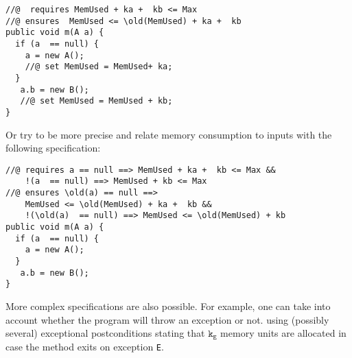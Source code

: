 \begin{lstlisting}[frame=trbl] 
//@  requires MemUsed + ka +  kb <= Max 
//@ ensures  MemUsed <= \old(MemUsed) + ka +  kb     
public void m(A a) {
  if (a  == null) {
    a = new A();
    //@ set MemUsed = MemUsed+ ka;
  }  
   a.b = new B();
   //@ set MemUsed = MemUsed + kb;
}
\end{lstlisting}
Or try to be more precise and relate memory consumption to inputs with
the following specification:
\begin{lstlisting}[frame=trbl] 
//@ requires a == null ==> MemUsed + ka +  kb <= Max &&	 
    !(a  == null) ==> MemUsed + kb <= Max
//@ ensures \old(a) == null ==> 
    MemUsed <= \old(MemUsed) + ka +  kb && 
    !(\old(a)  == null) ==> MemUsed <= \old(MemUsed) + kb    
public void m(A a) {
  if (a  == null) {
    a = new A();
  }  
   a.b = new B();
}
\end{lstlisting}
More complex specifications are also possible. For example, one can
take into account whether the program will throw an exception or not.
using (possibly several) exceptional postconditions stating that
$\texttt{k}_{\texttt{E}}$ memory units are allocated in case the
method exits on exception \texttt{E}.

